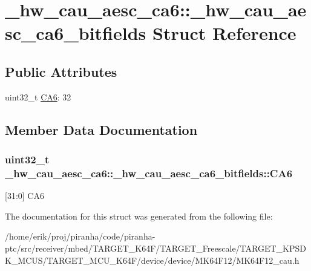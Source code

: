 \hypertarget{struct__hw__cau__aesc__ca6_1_1__hw__cau__aesc__ca6__bitfields}{}\section{\+\_\+hw\+\_\+cau\+\_\+aesc\+\_\+ca6\+:\+:\+\_\+hw\+\_\+cau\+\_\+aesc\+\_\+ca6\+\_\+bitfields Struct Reference}
\label{struct__hw__cau__aesc__ca6_1_1__hw__cau__aesc__ca6__bitfields}
\subsection*{Public Attributes}
\begin{DoxyCompactItemize}
\item 
uint32\+\_\+t \hyperlink{struct__hw__cau__aesc__ca6_1_1__hw__cau__aesc__ca6__bitfields_a65627ccbb8da11dc3c79e5e336d5fb71}{C\+A6}\+: 32
\end{DoxyCompactItemize}


\subsection{Member Data Documentation}
\subsubsection[{\texorpdfstring{C\+A6}{CA6}}]{\setlength{\rightskip}{0pt plus 5cm}uint32\+\_\+t \+\_\+hw\+\_\+cau\+\_\+aesc\+\_\+ca6\+::\+\_\+hw\+\_\+cau\+\_\+aesc\+\_\+ca6\+\_\+bitfields\+::\+C\+A6}\hypertarget{struct__hw__cau__aesc__ca6_1_1__hw__cau__aesc__ca6__bitfields_a65627ccbb8da11dc3c79e5e336d5fb71}{}\label{struct__hw__cau__aesc__ca6_1_1__hw__cau__aesc__ca6__bitfields_a65627ccbb8da11dc3c79e5e336d5fb71}
\mbox{[}31\+:0\mbox{]} C\+A6 

The documentation for this struct was generated from the following file\+:\begin{DoxyCompactItemize}
\item 
/home/erik/proj/piranha/code/piranha-\/ptc/src/receiver/mbed/\+T\+A\+R\+G\+E\+T\+\_\+\+K64\+F/\+T\+A\+R\+G\+E\+T\+\_\+\+Freescale/\+T\+A\+R\+G\+E\+T\+\_\+\+K\+P\+S\+D\+K\+\_\+\+M\+C\+U\+S/\+T\+A\+R\+G\+E\+T\+\_\+\+M\+C\+U\+\_\+\+K64\+F/device/device/\+M\+K64\+F12/M\+K64\+F12\+\_\+cau.\+h\end{DoxyCompactItemize}
